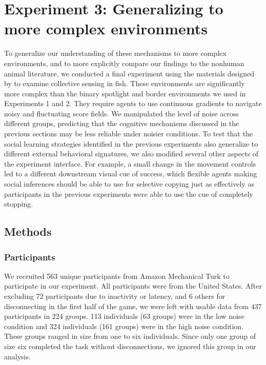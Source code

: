 \documentclass[12pt,letterpaper]{article}
\begin{document}
\section{Experiment 3: Generalizing to more complex environments}

To generalize our understanding of these mechanisms to more complex environments, and to more explicitly compare our findings to the nonhuman animal literature, we conducted a final experiment using the materials designed by  to examine collective sensing in fish.
These environments are significantly more complex than the binary spotlight and border environments we used in Experiments 1 and 2.
They require agents to use continuous gradients to navigate noisy and fluctuating score fields.
We manipulated the level of noise across different groups, predicting that the cognitive mechanisms discussed in the previous sections may be less reliable under noisier conditions. To test that the social learning strategies identified in the previous experiments also generalize to different external behavioral signatures, we also modified several other aspects of the experiment interface.
For example, a small change in the movement controls led to a different downstream visual cue of success, which flexible agents making social inferences should be able to use for selective copying just as effectively as participants in the previous experiments were able to use the cue of completely stopping.

\subsection{Methods}
\subsubsection{Participants}

We recruited 563 unique participants from Amazon Mechanical Turk to participate in our experiment.
All participants were from the United States.
After excluding 72 participants due to inactivity or latency, and 6 others for disconnecting in the first half of the game, we were left with usable data from 437 participants in 224 groups.
113 individuals (63 groups) were in the low noise condition and 324 individuals (161 groups) were in the high noise condition. 
These groups ranged in size from one to six individuals.  
Since only one group of size six completed the task without disconnections, we ignored this group in our analysis.
\end{document}
